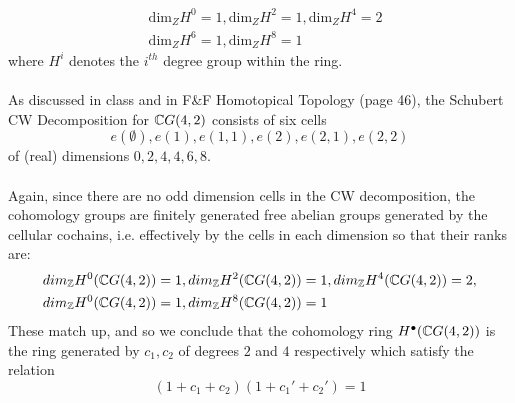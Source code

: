 \documentclass[11pt]{article}
\begin{document}
\begin{align*}
  &\mathrm{dim}_Z H^0 = 1, \mathrm{dim}_Z H^2 = 1, \mathrm{dim}_Z H^4 = 2 \\
  &\mathrm{dim}_Z H^6 = 1, \mathrm{dim}_Z H^8 = 1
\end{align*} where $H^i$ denotes the $i^{th}$ degree group within the ring.
\\
\\
As discussed in class and in F\&F Homotopical Topology (page 46), the Schubert CW Decomposition for $\mathbb{C} G(4,2)$ consists of six cells $$ e(\emptyset), e(1), e(1,1), e(2), e(2,1), e(2,2) $$ of (real) dimensions $0, 2, 4, 4, 6, 8$.
\\
\\
Again, since there are no odd dimension cells in the CW decomposition, the cohomology groups are finitely generated free abelian groups generated by the cellular cochains, i.e. effectively by the cells in each dimension so that their ranks are:
\begin{align*}
  &dim_{\mathbb{Z}} H^0(\mathbb{C} G(4,2)) = 1, dim_{\mathbb{Z}} H^2(\mathbb{C} G(4,2)) = 1, dim_{\mathbb{Z}} H^4(\mathbb{C} G(4,2)) = 2, \\
  &dim_{\mathbb{Z}} H^0(\mathbb{C} G(4,2)) = 1, dim_{\mathbb{Z}} H^8(\mathbb{C} G(4,2)) = 1 
\end{align*}  These match up, and so we conclude that the cohomology ring $H^{\bullet}(\mathbb{C} G(4,2))$ is the ring generated by $c_1, c_2$ of degrees $2$ and $4$ respectively which satisfy the relation $$ (1+c_1+c_2)(1+c_1'+c_2') = 1 $$











\end{document}
